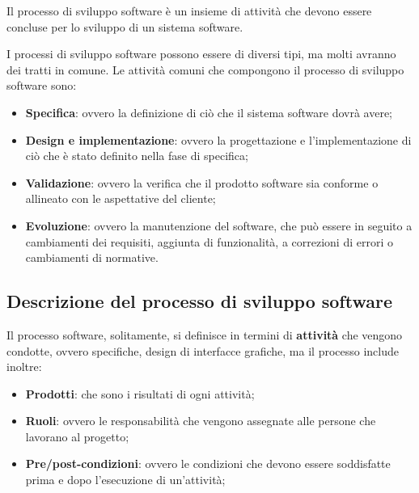 \begin{tcolorbox}[title = Processo di sviluppo software]
    Il processo di sviluppo software è un insieme di attività che 
    devono essere concluse per lo sviluppo di un sistema software.
\end{tcolorbox}
I processi di sviluppo software possono essere di diversi tipi,
ma molti avranno dei tratti in comune. 
Le attività comuni che compongono il processo di sviluppo software sono:
\begin{itemize}
    \item \textbf{Specifica}: ovvero la definizione di ciò che il sistema software
    dovrà avere;
    \item \textbf{Design e implementazione}: ovvero la progettazione e l'implementazione
    di ciò che è stato definito nella fase di specifica;
    \item \textbf{Validazione}: ovvero la verifica che il prodotto software sia conforme
    o allineato con le aspettative del cliente;
    \item \textbf{Evoluzione}: ovvero la manutenzione del software, che può essere
    in seguito a cambiamenti dei requisiti, aggiunta di funzionalità, a correzioni
    di errori o cambiamenti di normative.
\end{itemize}
\subsection{Descrizione del processo di sviluppo software}
Il processo software, solitamente, si definisce in termini di \textbf{attività}
che vengono condotte, ovvero specifiche, design di interfacce grafiche, ma il processo include 
inoltre:
\begin{itemize}
    \item \textbf{Prodotti}: che sono i risultati di ogni attività;
    \item \textbf{Ruoli}: ovvero le responsabilità che vengono assegnate alle persone
    che lavorano al progetto;
    \item \textbf{Pre/post-condizioni}: ovvero le condizioni che devono essere soddisfatte
    prima e dopo l'esecuzione di un'attività;
\end{itemize}

